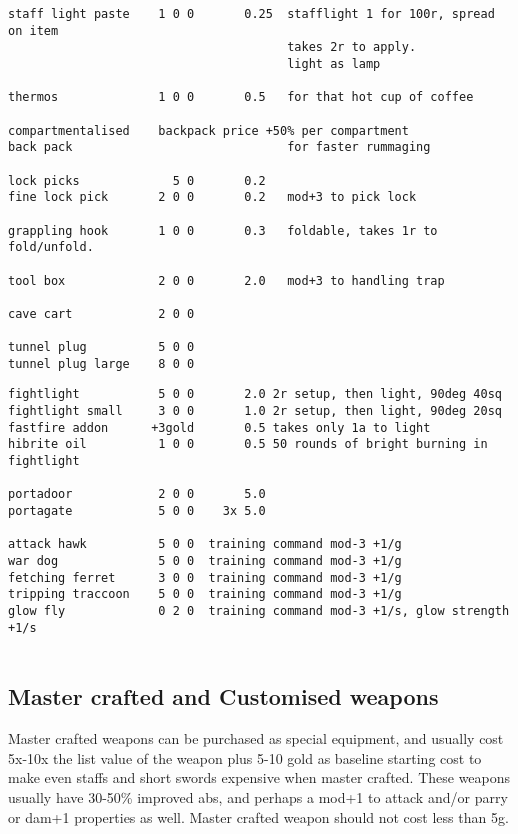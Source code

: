 \begin{verbatim}
staff light paste    1 0 0       0.25  stafflight 1 for 100r, spread on item
                                       takes 2r to apply.
                                       light as lamp

thermos              1 0 0       0.5   for that hot cup of coffee

compartmentalised    backpack price +50% per compartment
back pack                              for faster rummaging

lock picks             5 0       0.2
fine lock pick       2 0 0       0.2   mod+3 to pick lock

grappling hook       1 0 0       0.3   foldable, takes 1r to fold/unfold.

tool box             2 0 0       2.0   mod+3 to handling trap

cave cart            2 0 0

tunnel plug          5 0 0
tunnel plug large    8 0 0

\end{verbatim} \goodbreak \begin{verbatim}
fightlight           5 0 0       2.0 2r setup, then light, 90deg 40sq
fightlight small     3 0 0       1.0 2r setup, then light, 90deg 20sq
fastfire addon      +3gold       0.5 takes only 1a to light
hibrite oil          1 0 0       0.5 50 rounds of bright burning in fightlight

portadoor            2 0 0       5.0
portagate            5 0 0    3x 5.0

attack hawk          5 0 0  training command mod-3 +1/g
war dog              5 0 0  training command mod-3 +1/g
fetching ferret      3 0 0  training command mod-3 +1/g
tripping traccoon    5 0 0  training command mod-3 +1/g
glow fly             0 2 0  training command mod-3 +1/s, glow strength +1/s


\end{verbatim}
\normalsize


\subsection*{Master crafted and Customised weapons}
Master crafted weapons can be purchased as special equipment, and usually cost 5x-10x the list value of the weapon plus 5-10 gold as baseline starting cost to make even staffs and short swords expensive when master crafted. These weapons usually have 30-50\% improved abs, and perhaps a mod+1 to attack and/or parry or dam+1 properties as well. Master crafted weapon should not cost less than 5g.

